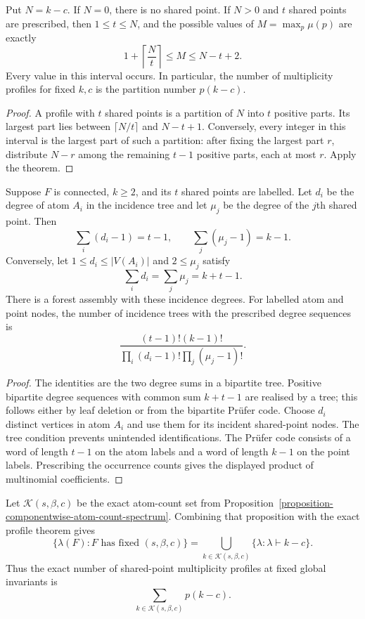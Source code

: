 \begin{corollary}
\label{corollary-shared-point-count-largest-multiplicity}
Put $N=k-c$.  If $N=0$, there is no shared point.  If $N>0$ and $t$ shared
points are prescribed, then $1\le t\le N$, and the possible values of
$M=\max_p\mu(p)$ are exactly
\[
1+\left\lceil\frac Nt\right\rceil
\le M\le N-t+2.
\]
Every value in this interval occurs.  In particular, the number of
multiplicity profiles for fixed $k,c$ is the partition number $p(k-c)$.
\end{corollary}
\begin{proof}
A profile with $t$ shared points is a partition of $N$ into $t$ positive
parts.  Its largest part lies between $\lceil N/t\rceil$ and $N-t+1$.
Conversely, every integer in this interval is the largest part of such a
partition: after fixing the largest part $r$, distribute $N-r$ among the
remaining $t-1$ positive parts, each at most $r$.  Apply the theorem.
\end{proof}

\begin{proposition}
\label{proposition-capacity-aware-incidence-degrees}
Suppose $F$ is connected, $k\ge2$, and its $t$ shared points are labelled.
Let $d_i$ be the degree of atom $A_i$ in the incidence tree and let
$\mu_j$ be the degree of the $j$th shared point.  Then
\[
\sum_i(d_i-1)=t-1,
\qquad
\sum_j(\mu_j-1)=k-1.
\]
Conversely, let $1\le d_i\le |V(A_i)|$ and $2\le\mu_j$ satisfy
\[
\sum_i d_i=\sum_j\mu_j=k+t-1.
\]
There is a forest assembly with these incidence degrees.  For labelled atom
and point nodes, the number of incidence trees with the prescribed degree
sequences is
\[
\frac{(t-1)!(k-1)!}
 {\prod_i(d_i-1)!\prod_j(\mu_j-1)!}.
\]
\end{proposition}
\begin{proof}
The identities are the two degree sums in a bipartite tree.  Positive
bipartite degree sequences with common sum $k+t-1$ are realised by a tree;
this follows either by leaf deletion or from the bipartite Prüfer code.
Choose $d_i$ distinct vertices in atom $A_i$ and use them for its incident
shared-point nodes.  The tree condition prevents unintended identifications.
The Prüfer code consists of a word of length $t-1$ on the atom labels and a
word of length $k-1$ on the point labels.  Prescribing the occurrence counts
gives the displayed product of multinomial coefficients.
\end{proof}

Let $\mathcal K(s,\beta,c)$ be the exact atom-count set from
Proposition~\ref{proposition-componentwise-atom-count-spectrum}.  Combining
that proposition with the exact profile theorem gives
\[
\{\lambda(F):F\text{ has fixed }(s,\beta,c)\}
=
\bigcup_{k\in\mathcal K(s,\beta,c)}
\{\lambda:\lambda\vdash k-c\}.
\]
Thus the exact number of shared-point multiplicity profiles at fixed global
invariants is
\[
\sum_{k\in\mathcal K(s,\beta,c)}p(k-c).
\]
